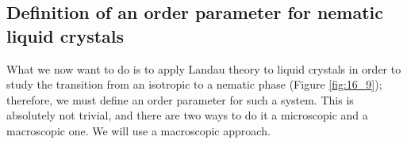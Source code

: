 \documentclass[../../Main/Main.tex]{subfiles}
\begin{document}
\begin{figure}[H]
\begin{minipage}[c]{0.5\linewidth}
\end{minipage}
\begin{minipage}[]{0.5\linewidth}
\centering
{}
\end{minipage}
\end{figure}



\subsection{Definition of an order parameter for nematic liquid crystals}
What we now want to do is to apply Landau theory to liquid crystals in order to study the transition from an isotropic to a nematic phase (Figure \ref{fig:16_9}); therefore, we must define an order parameter for such a system. This is absolutely not trivial, and there are two ways to do it a microscopic and a macroscopic one. We will use a macroscopic approach.
\end{document}
